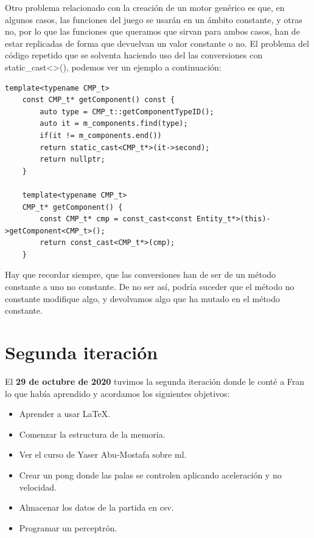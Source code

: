 Otro problema relacionado con la creación de un motor genérico es que, en algunos casos, las funciones del juego se usarán en un ámbito constante, y otras no, por lo que las funciones que queramos que sirvan para ambos casos, han de estar replicadas de forma que devuelvan un valor constante o no. El problema del código repetido que se solventa haciendo uso del las conversiones con static\_cast<>(), podemos ver un ejemplo a continuación:
\begin{lstlisting}[style=C-color, caption={Ejemplo de conversion de un método constante a no constante},label=C_code-color]
	template<typename CMP_t>
	const CMP_t* getComponent() const {
		auto type = CMP_t::getComponentTypeID();
		auto it = m_components.find(type);
		if(it != m_components.end()) 
		return static_cast<CMP_t*>(it->second);
		return nullptr;
	}
	
	template<typename CMP_t>
	CMP_t* getComponent() {
		const CMP_t* cmp = const_cast<const Entity_t*>(this)->getComponent<CMP_t>();
		return const_cast<CMP_t*>(cmp);
	}
\end{lstlisting}
Hay que recordar siempre, que las conversiones han de ser de un método constante a uno no constante. De no ser así, podría suceder que el método no constante modifique algo, y devolvamos algo que ha mutado en el método constante.

\section{Segunda iteración}
El \textbf{29 de octubre de 2020} tuvimos la segunda iteración donde le conté a Fran lo que había aprendido y acordamos los siguientes objetivos:
\begin{itemize}
  \item Aprender a usar \LaTeX.
  \item Comenzar la estructura de la memoria.
  \item Ver el curso de Yaser Abu-Mostafa sobre \gls{ml}.
  \item Crear un pong donde las palas se controlen aplicando aceleración y no velocidad.
  \item Almacenar los datos de la partida en \gls{csv}.
  \item Programar un perceptrón.
\end{itemize}

